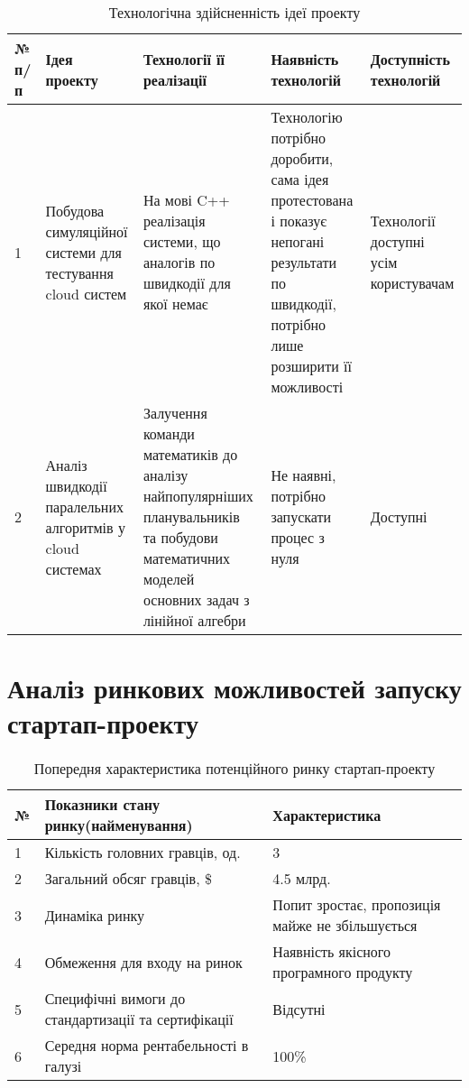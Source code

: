 \begin{table}[H]
	\begin{tabular}
		{|l|p{3.5cm}|p{3.5cm}|p{3.5cm}|p{3.5cm}|} \hline
		
		\bf{№ п/п}
		& \bf{Ідея проекту}
		& \bf{Технології її реалізації}
		& \bf{Наявність технологій}
		& \bf{Доступність технологій}
		\\ \hline
		
		1
		& Побудова симуляційної системи для тестування cloud систем
		& На мові C++ реалізація системи, що аналогів по швидкодії для якої немає
		& Технологію потрібно доробити, сама ідея протестована і показує непогані результати по швидкодії, потрібно лише розширити її можливості
		& Технології доступні усім користувачам
		\\ \hline
		
		2
		& Аналіз швидкодії паралельних алгоритмів у cloud системах
		& Залучення команди математиків до аналізу найпопулярніших планувальників та побудови математичних моделей основних задач з лінійної алгебри
		& Не наявні, потрібно запускати процес з нуля
		& Доступні
		\\ \hline
	\end{tabular}
	\caption{Технологічна здійсненність ідеї проекту}
\end{table}

\section{Аналіз ринкових можливостей запуску стартап-проекту}

\begin{table}[H]
	\begin{center}
		\begin{tabular}
			{|l|p{6cm}|p{4cm}|}\hline
			\bf{№} & \bf{Показники стану ринку(найменування)} & \bf{Характеристика} \\ \hline
			1 & Кількість головних гравців, од. & 3 \\ \hline
			2 & Загальний обсяг гравців, \$ & 4.5 млрд. \\ \hline
			3 & Динаміка ринку & Попит зростає, пропозиція майже не збільшується \\ \hline
			4 & Обмеження для входу на ринок& Наявність якісного програмного продукту \\ \hline
			5 & Специфічні вимоги до стандартизації та сертифікації& Відсутні \\ \hline
			6 & Середня норма рентабельності в галузі & 100\% \\ \hline
		\end{tabular}
	\end{center}
	\caption{Попередня характеристика потенційного ринку стартап-проекту}
\end{table}

